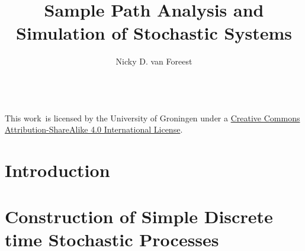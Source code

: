 \title{Sample Path Analysis  and Simulation  of Stochastic Systems}
\author{Nicky D. van  Foreest}


\frontmatter
\maketitle


\tableofcontents

\vfill

\noindent
\href{https://creativecommons.org/licenses/by-sa/4.0/}{\ccbysa} \\
This work\ is licensed by the University of Groningen under a
\href{https://creativecommons.org/licenses/by-sa/4.0/}{Creative Commons Attribution-ShareAlike 4.0 International License}.


\newpage

\tableofcontents





\mainmatter

\edef\marginnotetextwidth{\the\textwidth}


\chapter{Introduction}
\label{cha:introduction}








\chapter{Construction of Simple Discrete time Stochastic Processes}
\label{cha:single-stat-queu}


